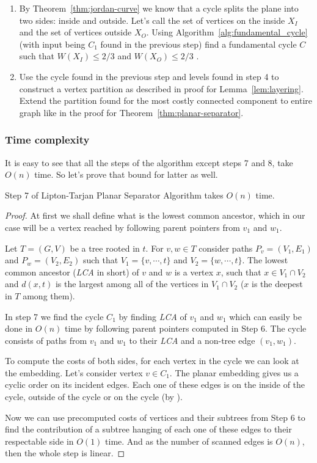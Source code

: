 \begin{enumerate}
    \item By Theorem~\ref{thm:jordan-curve} we know that a cycle 
        splits the plane into two sides: inside and outside. Let's call the set of 
        vertices on the inside $X_I$ and the set of vertices outside $X_O$. Using
        Algorithm~\ref{alg:fundamental_cycle} (with input being $C_1$ found in the previous step)
        find a fundamental cycle $C$ such 
        that $W(X_I) \leq 2/3$ and $W(X_O) \leq 2/3$ .

    \item Use the cycle found in the previous step and levels found in step 4
        to construct a vertex partition as described in proof for
        Lemma~\ref{lem:layering}. Extend the partition found for the most costly
        connected component to entire graph like in the proof for
        Theorem~\ref{thm:planar-separator}.
\end{enumerate}
\subsubsection*{Time complexity}
It is easy to see that all the steps of the algorithm except steps 7 and 8, take $O(n)$ time.
So let's prove that bound for latter as well.
\begin{lemma}
    Step 7 of Lipton-Tarjan Planar Separator Algorithm takes $O(n)$ time.
\end{lemma}
\begin{proof}
    At first we shall define what is the lowest common ancestor, which in our case
    will be a vertex reached by following parent pointers from $v_1$ and $w_1$.
    \begin{defn}
        Let $T = (G, V)$ be a tree rooted in $t$. For $v, w \in T$ consider paths 
        $P_v = (V_1, E_1)$ and $P_w = (V_2, E_2)$ such that $V_1 = \{v, \cdots, t\}$
        and $V_2 = \{w, \cdots, t\}$. The lowest common ancestor (\emph{LCA} in short) 
        of $v$ and $w$ is a vertex $x$, such that $x \in V_1 \cap V_2$ and $d(x, t)$ is 
        the largest among all of the vertices in $V_1 \cap V_2$ ($x$ is the deepest in $T$
        among them).
    \end{defn}
    In step 7 we find the cycle $C_1$ by finding \emph{LCA} of $v_1$ and $w_1$ which can
    easily be done in $O(n)$ time by following parent pointers computed in Step 6. 
    The cycle consists of paths from $v_1$ and $w_1$ to their \emph{LCA} and a non-tree 
    edge $(v_1, w_1)$.

    To compute the costs of both sides, for each vertex in the cycle
    we can look at the embedding. Let's consider vertex $v \in C_1$. The planar embedding 
    gives us a cyclic order on its incident edges. Each one of these edges is on the inside 
    of the cycle, outside of the cycle or on the cycle (by ). 

    Now we can use precomputed costs of vertices and their subtrees from Step 6 to find 
    the contribution of a subtree hanging of each one of these edges to their respectable side 
    in $O(1)$ time. And as the number of scanned edges is $O(n)$, then the whole step is linear.
\end{proof}
 
